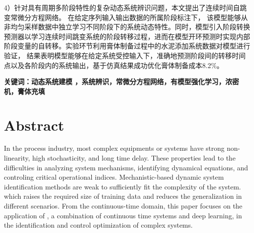 4）针对具有周期多阶段特性的复杂动态系统辨识问题，本文提出了连续时间自跳变常微分方程网络。
在给定序列输入输出数据的所属阶段标注下，
该模型能够从非均匀采样数据中独立学习不同阶段下的系统动态特性。同时，模型引入阶段转换预测器以学习连续时间跳变系统的阶段转移过程，进而在模型开环预测时实现内部阶段变量的自转移。实验环节利用膏体制备过程中的水泥添加系统数据对模型进行验证，
结果表明模型能够在给定系统受控输入下，准确地预测阶段间的转移时间点以及各阶段内的系统输出，基于仿真结果成功优化膏体制备成本8.2\%。


\vskip 30bp
{

    \textbf{ \heiti {} 关键词：动态系统建模 ，系统辨识，常微分方程网络，有模型强化学习，浓密机，膏体充填}
}



\chapter*{ Abstract }
In the process industry, most complex equipments or systems have strong non-linearity, high stochasticity, and long time delay.
These properties lead to the difficulties in analyzing system mechanisms, identifying dynamical equations, and controling critical operational indices. 
Mechanistic-based dynamic system identification methods are weak to sufficiently fit the complexity of the system.
which raises the required size of training data and reduces the generalization in different scenarios.
From the continuous-time domain, this paper focuses on the application of , a combination of continuous time systems and deep learning, in the identification and control optimization of complex systems.

